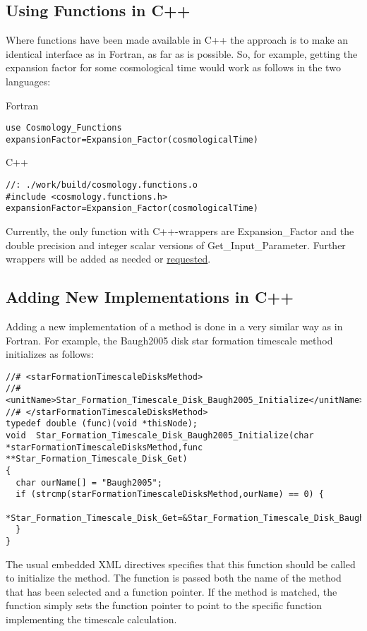 \subsection{Using Functions in C++}

Where functions have been made available in C++ the approach is to make an identical interface as in Fortran, as far as is possible. So, for example, getting the expansion factor for some cosmological time would work as follows in the two languages:

\noindent Fortran
\begin{verbatim}
use Cosmology_Functions
expansionFactor=Expansion_Factor(cosmologicalTime)
\end{verbatim}

\noindent C++
\begin{verbatim}
//: ./work/build/cosmology.functions.o
#include <cosmology.functions.h>
expansionFactor=Expansion_Factor(cosmologicalTime)
\end{verbatim}

Currently, the only function with C++-wrappers are {\normalfont \ttfamily Expansion\_Factor} and the double precision and integer scalar versions of {\normalfont \ttfamily Get\_Input\_Parameter}. Further wrappers will be added as needed or \href{mailto:abenson@.carnegiescience.edu}{requested}.

\subsection{Adding New Implementations in C++}

Adding a new implementation of a method is done in a very similar way as in Fortran. For example, the {\normalfont \ttfamily Baugh2005} disk star formation timescale method initializes as follows:

\begin{verbatim}
//# <starFormationTimescaleDisksMethod>
//#  <unitName>Star_Formation_Timescale_Disk_Baugh2005_Initialize</unitName>
//# </starFormationTimescaleDisksMethod>
typedef double (func)(void *thisNode);
void  Star_Formation_Timescale_Disk_Baugh2005_Initialize(char *starFormationTimescaleDisksMethod,func **Star_Formation_Timescale_Disk_Get)
{
  char ourName[] = "Baugh2005";
  if (strcmp(starFormationTimescaleDisksMethod,ourName) == 0) {
    *Star_Formation_Timescale_Disk_Get=&Star_Formation_Timescale_Disk_Baugh2005;
  }
}
\end{verbatim}
The usual embedded XML directives specifies that this function should be called to initialize the method. The function is passed both the name of the method that has been selected and a function pointer. If the method is matched, the function simply sets the function pointer to point to the specific function implementing the timescale calculation.

